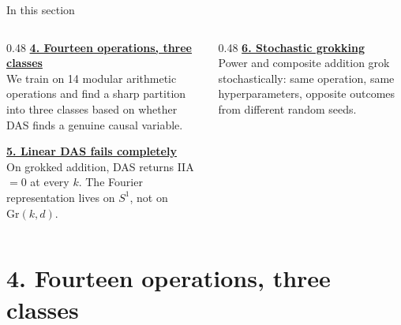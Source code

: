 \documentclass[aspectratio=169,11pt]{beamer}
\begin{document}

\begin{frame}[plain]
\vfill
\begin{center}
  \setlength{\fboxrule}{2.5pt}%
\end{center}
\vfill
\end{frame}

\begin{frame}{In this section}
\begin{columns}[T]
\begin{column}{0.48\textwidth}
\textbf{\hyperlink{sec4}{4. Fourteen operations, three classes}}\\[0.2em]
{\small We train on 14 modular arithmetic operations and find a sharp partition into three classes based on whether DAS finds a genuine causal variable.}

\vspace{0.6em}
\textbf{\hyperlink{sec5}{5. Linear DAS fails completely}}\\[0.2em]
{\small On grokked addition, DAS returns IIA $= 0$ at every $k$. The Fourier representation lives on $S^1$, not on $\mathrm{Gr}(k,d)$.}
\end{column}
\begin{column}{0.48\textwidth}
\textbf{\hyperlink{sec6}{6. Stochastic grokking}}\\[0.2em]
{\small Power and composite addition grok stochastically: same operation, same hyperparameters, opposite outcomes from different random seeds.}
\end{column}
\end{columns}
\end{frame}

\hypertarget{sec4}{}
\section{4. Fourteen operations, three classes}
\end{document}
